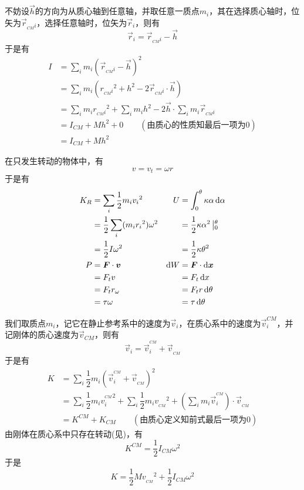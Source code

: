 \newpage
\begin{prove}[\itr{Parallel Axis Theorem}{平行轴定理}\qquad$I=I_{CM}+Mh^2$]
	不妨设$\vec{h}$的方向为从质心轴到任意轴，并取任意一质点$m_i$，其在选择质心轴时，位矢为$\vec{r}_{_{CM}i}$，选择任意轴时，位矢为$\vec{r}_i$，则有\[\vec{r}_i=\vec{r}_{_{CM}i}-\vec{h}\]
	于是有
	\begin{align*}
		I&=\sum_{i}m_i(\vec{r}_{_{CM}i}-\vec{h})^2\\
		&=\sum_{i}m_i(r_{_{CM}i}{}^2+h^2-2\vec{r}_{_{CM}i}\cdot\vec{h})\\
		&=\sum_{i}m_ir_{_{CM}i}{}^2+\sum_{i}m_ih^2-2\vec{h}\cdot\sum_{i}m_i\vec{r}_{_{CM}i}\\
		&=I_{CM}+Mh^2+0\qquad(\text{由质心的性质知最后一项为0})\\
		&=I_{CM}+Mh^2
	\end{align*}
\end{prove}
\begin{prove}
	在只发生转动的物体中，有\[v=v_t=\omega r\]于是有
	\begin{align*}
		K_R&=\sum_i\dfrac{1}{2}m_iv_i{}^2&U&=\int_0^{\theta}\kappa\alpha\dif\alpha\\
		&=\dfrac{1}{2}\sum_i(m_i r_i{}^2)\omega^2&&=\dfrac{1}{2}\kappa\alpha^2\left|_0^{\theta}\right.\\
		&=\dfrac{1}{2}I\omega^2&&=\dfrac{1}{2}\kappa\theta^2\\
		P&=\vec{F}\cdot \vec{v}&\dif W&=\vec{F}\cdot\dif \vec{x}\\
		&=F_tv&&=F_t\dif x\\
		&=F_tr_\omega&&=F_tr\dif\theta\\
		&=\tau\omega&&=\tau\dif\theta
	\end{align*}
\end{prove}
\begin{prove}[\itr{Konig's Theorem}{柯尼希定理}\qquad$K=K_{CM}+K^{CM}$]
	我们取质点$m_i$，记它在静止参考系中的速度为$\vec{v}_i$，在质心系中的速度为$\vec{v}^{CM}_i$，并记刚体的质心速度为$\vec{v}_{CM}$，则有
	\[\vec{v}_i=\vec{v}_i^{^{CM}}+\vec{v}_{_{CM}}\]
	于是有
	\begin{align*}
		K&=\sum_i\dfrac{1}{2}m_i(\vec{v}_i^{^{CM}}+\vec{v}_{_{CM}})^2\\
		&=\sum_i\dfrac{1}{2}m_i{v_i^{^{CM}}}^2+\sum_i\dfrac{1}{2}m_i{v_{_{CM}}}^2+(\sum_im_i\vec{v}_i^{^{CM}})\cdot\vec{v}_{_{CM}}\\
		&=K^{CM}+K_{CM}\qquad(\text{由质心定义知前式最后一项为0})
	\end{align*}
	由刚体在质心系中只存在转动(见)，有
	\[K^{CM}=\dfrac{1}{2}I_{CM}\omega^2\]
	于是
	\[K=\dfrac{1}{2}M{v_{_{CM}}}^2+\dfrac{1}{2}I_{CM}\omega^2\]
\end{prove}
